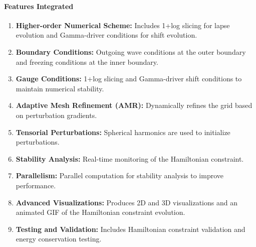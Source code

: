 \documentclass[12pt]{article}
\begin{document}
\paragraph{Features Integrated}
\begin{enumerate}
    \item \textbf{Higher-order Numerical Scheme:} Includes 1+log slicing for lapse evolution and Gamma-driver conditions for shift evolution.
    \item \textbf{Boundary Conditions:} Outgoing wave conditions at the outer boundary and freezing conditions at the inner boundary.
    \item \textbf{Gauge Conditions:} 1+log slicing and Gamma-driver shift conditions to maintain numerical stability.
    \item \textbf{Adaptive Mesh Refinement (AMR):} Dynamically refines the grid based on perturbation gradients.
    \item \textbf{Tensorial Perturbations:} Spherical harmonics are used to initialize perturbations.
    \item \textbf{Stability Analysis:} Real-time monitoring of the Hamiltonian constraint.
    \item \textbf{Parallelism:} Parallel computation for stability analysis to improve performance.
    \item \textbf{Advanced Visualizations:} Produces 2D and 3D visualizations and an animated GIF of the Hamiltonian constraint evolution.
    \item \textbf{Testing and Validation:} Includes Hamiltonian constraint validation and energy conservation testing.
\end{enumerate}
\end{document}

